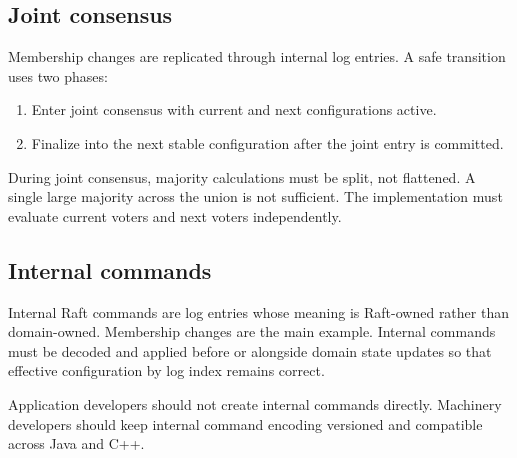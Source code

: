 \subsection{Joint consensus}

Membership changes are replicated through internal log entries. A safe transition
uses two phases:

\begin{enumerate}
\item Enter joint consensus with current and next configurations active.
\item Finalize into the next stable configuration after the joint entry is committed.
\end{enumerate}

During joint consensus, majority calculations must be split, not flattened. A
single large majority across the union is not sufficient. The implementation must
evaluate current voters and next voters independently.

\subsection{Internal commands}

Internal Raft commands are log entries whose meaning is Raft-owned rather than
domain-owned. Membership changes are the main example. Internal commands must be
decoded and applied before or alongside domain state updates so that effective
configuration by log index remains correct.

Application developers should not create internal commands directly. Machinery
developers should keep internal command encoding versioned and compatible across
Java and C++.
